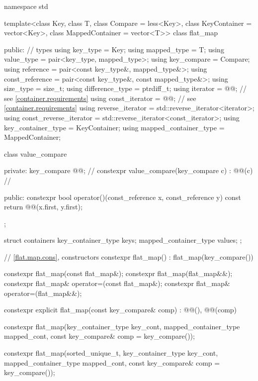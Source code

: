 \begin{codeblock}
namespace std {
  template<class Key, class T, class Compare = less<Key>,
           class KeyContainer = vector<Key>, class MappedContainer = vector<T>>
  class flat_map {
  public:
    // types
    using key_type               = Key;
    using mapped_type            = T;
    using value_type             = pair<key_type, mapped_type>;
    using key_compare            = Compare;
    using reference              = pair<const key_type&, mapped_type&>;
    using const_reference        = pair<const key_type&, const mapped_type&>;
    using size_type              = size_t;
    using difference_type        = ptrdiff_t;
    using iterator               = @@; // see \ref{container.requirements}
    using const_iterator         = @@; // see \ref{container.requirements}
    using reverse_iterator       = std::reverse_iterator<iterator>;
    using const_reverse_iterator = std::reverse_iterator<const_iterator>;
    using key_container_type     = KeyContainer;
    using mapped_container_type  = MappedContainer;

    class value_compare {
    private:
      key_compare @@;                                         // \expos
      constexpr value_compare(key_compare c) : @@(c) { }      // \expos

    public:
      constexpr bool operator()(const_reference x, const_reference y) const {
        return @@(x.first, y.first);
      }
    };

    struct containers {
      key_container_type keys;
      mapped_container_type values;
    };

    // \ref{flat.map.cons}, constructors
    constexpr flat_map() : flat_map(key_compare()) { }

    constexpr flat_map(const flat_map&);
    constexpr flat_map(flat_map&&);
    constexpr flat_map& operator=(const flat_map&);
    constexpr flat_map& operator=(flat_map&&);

    constexpr explicit flat_map(const key_compare& comp)
      : @@(), @@(comp) { }

    constexpr flat_map(key_container_type key_cont, mapped_container_type mapped_cont,
                       const key_compare& comp = key_compare());

    constexpr flat_map(sorted_unique_t, key_container_type key_cont,
                       mapped_container_type mapped_cont,
                       const key_compare& comp = key_compare());

}}
\end{codeblock}
